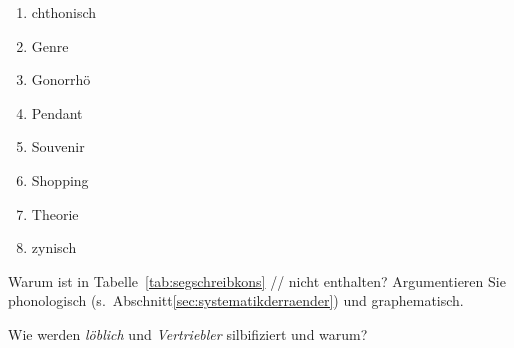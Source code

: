 \begin{enumerate}\Lf
  \item chthonisch
  \item Genre
  \item Gonorrhö
  \item Pendant
  \item Souvenir
  \item Shopping
  \item Theorie
  \item zynisch
\end{enumerate}

\Uebung[\tristar] \label{u147} Warum ist in Tabelle~\ref{tab:segschreibkons} // nicht enthalten?
Argumentieren Sie phonologisch (s.\ Abschnitt\ref{sec:systematikderraender}) und graphematisch.

\Uebung[\tristar] \label{u148} Wie werden \textit{löblich} und \textit{Vertriebler} silbifiziert und warum?


